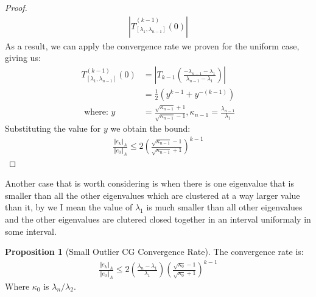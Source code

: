 \documentclass[]{article}
\theoremstyle{definition}
\newtheorem{prop}{Proposition}[section]  %
\begin{document}
\begin{proof}
\begin{align}
{                    \left|
                        \hat{T}_{[\lambda_1, \lambda_{n - 1}]}^{(k - 1)}(0)
                    \right|}
                \end{align}
                As a result, we can apply the convergence rate we proven for the uniform case, giving us: 
                \begin{align}
                    T^{(k - 1)}_{[\lambda_1, \lambda_{n - 1}]}
                    \left(
                        0
                    \right)
                    &= \left|
                        T_{k-1}\left(
                            \frac{
                                -\lambda_{n-1} - \lambda_1
                            }
                            {\lambda_{n-1}- \lambda_1}
                        \right)
                    \right|
                    \\ 
                    &=
                    \frac{1}{2}(y^{k - 1} + y^{-(k - 1)})
                    \\
                    \text{ where: } y &= \frac{\sqrt{\kappa_{n - 1}} + 1}{\sqrt{\kappa_{n - 1}} - 1}, \kappa_{n - 1} = \frac{\lambda_{n - 1}}{\lambda_1}
                \end{align}
                Substituting the value for $y$ we obtain the bound: 
                \begin{align}
                    \frac{\Vert e_k\Vert_A}{\Vert e_0\Vert_A} \le 
                    2\left(
                        \frac{\sqrt{\kappa_{n - 1}} - 1}{\sqrt{\kappa_{n - 1}} + 1}
                    \right)^{k - 1}
                \end{align}
            \end{proof}
            Another case that is worth considering is when there is one eigenvalue that is smaller than all the other eigenvalues which are clustered at a way larger value than it, by we I mean the value of $\lambda_1$ is much smaller than all other eigenvalues and the other eigenvalues are clutered closed together in an interval uniformaly in some interval. 
            \begin{prop}[Small Outlier CG Convergence Rate]
                The convergence rate is: 
                \begin{align}
                    \frac{\Vert e_k\Vert_A}{\Vert e_0\Vert_A} \le 
                    2\left(
                        \frac{\lambda_n - \lambda_1}{\lambda_1}
                    \right)
                    \left(
                        \frac{\sqrt{\kappa_0} - 1}{\sqrt{\kappa_0} + 1}
                    \right)^{k - 1}
                \end{align}
                Where $\kappa_0$ is $\lambda_n/\lambda_2$. 
            \end{prop}
\end{document}
